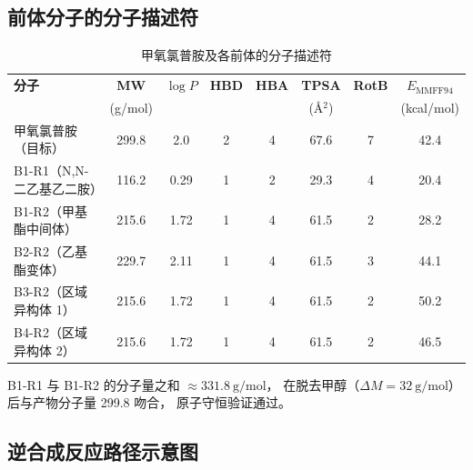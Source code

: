 \documentclass[a4paper, 12pt]{article}
\begin{document}
\subsection{前体分子的分子描述符}

\begin{table}[H]
  \centering
  \caption{甲氧氯普胺及各前体的分子描述符}
  \label{tab:mol_props}
  \small
  \begin{tabular}{lccccccc}
    \toprule
    \textbf{分子} &
    \textbf{MW} &
    \textbf{$\log P$} &
    \textbf{HBD} &
    \textbf{HBA} &
    \textbf{TPSA} &
    \textbf{RotB} &
    $E_{\text{MMFF94}}$ \\
    & (g/mol) & & & & (\AA$^2$) & & (kcal/mol) \\
    \midrule
    甲氧氯普胺（目标）         & 299.8 & 2.0  & 2 & 4 & 67.6 & 7 & 42.4 \\
    B1-R1（N,N-二乙基乙二胺）  & 116.2 & 0.29 & 1 & 2 & 29.3 & 4 & 20.4 \\
    B1-R2（甲基酯中间体）      & 215.6 & 1.72 & 1 & 4 & 61.5 & 2 & 28.2 \\
    B2-R2（乙基酯变体）        & 229.7 & 2.11 & 1 & 4 & 61.5 & 3 & 44.1 \\
    B3-R2（区域异构体 1）      & 215.6 & 1.72 & 1 & 4 & 61.5 & 2 & 50.2 \\
    B4-R2（区域异构体 2）      & 215.6 & 1.72 & 1 & 4 & 61.5 & 2 & 46.5 \\
    \bottomrule
  \end{tabular}
\end{table}

B1-R1 与 B1-R2 的分子量之和 $\approx 331.8\ \text{g/mol}$，
在脱去甲醇（$\Delta M = 32\ \text{g/mol}$）后与产物分子量 299.8 吻合，
原子守恒验证通过。

\subsection{逆合成反应路径示意图}
\end{document}
